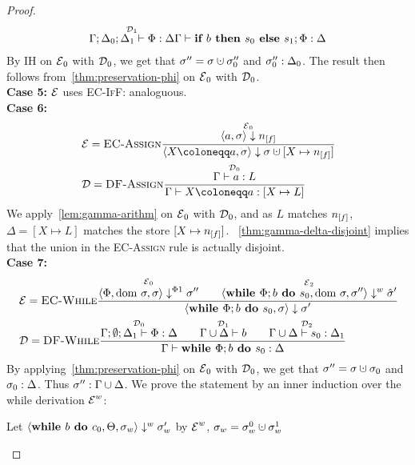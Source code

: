 \begin{proof}
\begin{align*}
{        \overset{\operatorname{\mathcal{D}}_1}{\Gamma;\Delta_0;\Delta_1 \vdash {\Phi}: \Delta}}
        {\Gamma \vdash {\textbf{if }{b} \textbf{ then }{s_0}\textbf{ else }{s_1};{\Phi}}: \Delta}
    \end{align*}
    By IH on $\operatorname{\mathcal{E}}_0$ with $\operatorname{\mathcal{D}}_0$, we get that $\store'' = \store \dunion \store''_0$ and 
    ${\sigma''_0}:{\Delta_0}$.
    The result then follows from~\autoref{thm:preservation-phi} on $\operatorname{\mathcal{E}}_0$ with $\operatorname{\mathcal{D}}_0$.\\
    \textbf{Case 5:}
    $\operatorname{\mathcal{E}}$ uses \textsc{EC-IfF}: analoguous.\\
    \textbf{Case 6:}
    \begin{align*}
        &\E = \bsrule{EC-Assign}{\overset{\E_0}{\bigstep{a}{\store}{\flagged{}}}}
        {\bigstep{\defaultstore}{\store}{\storeassign{\store}{X \mapsto \flagged{}}}}\\
        &\D = \trule{DF-Assign}{\overset{\D_0}{\typestep{\Gamma}{a}{L}}}
        {\typestep{\Gamma}{\defaultstore}{[X \mapsto L]}}
    \end{align*}
    We apply~\autoref{lem:gamma-arithm} on $\operatorname{\mathcal{E}}_0$ with $\operatorname{\mathcal{D}}_0$,
    and as $L$ matches $\flagged{}$, $\Delta = [X \mapsto L]$ matches the store
    $[X \mapsto \flagged{}]$.
    ~\autoref{thm:gamma-delta-disjoint} implies that the union in the \textsc{EC-Assign}
    rule is actually disjoint.
    \\
    \textbf{Case 7:}\\
    \begin{align*}
        &\operatorname{\mathcal{E}} = \textsc{EC-While}\frac{\displaystyle \overset{\operatorname{\mathcal{E}}_0}{\langle \Phi, \text{dom }{\sigma}, \sigma \rangle \downarrow^{\Phi1} \sigma''}\qquad
        \overset{\operatorname{\mathcal{E}}_2}{\langle \textbf{while }\Phi;{b} \textbf{ do } {s_0}, \text{dom }{\sigma}, \sigma'' \rangle \downarrow^w \hat{\sigma}'}}{\displaystyle \langle \textbf{while }\Phi;{b} \textbf{ do } {s_0}, \sigma \rangle \downarrow \sigma'}\\
        &\operatorname{\mathcal{D}} = \textsc{DF-While}\frac{\displaystyle \overset{\operatorname{\mathcal{D}}_0}{\Gamma;\emptyset;\Delta_1 \vdash {\Phi}: \Delta}\qquad
        \overset{\operatorname{\mathcal{D}}_1}{\Gamma \cup \Delta \vdash {b}}\qquad
        \overset{\operatorname{\mathcal{D}}_2}{\Gamma \cup \Delta \vdash {s_0}: \Delta_1}}{\displaystyle \Gamma \vdash {\textbf{while }\Phi;{b} \textbf{ do } {s_0}}: \Delta}
    \end{align*}
    By applying~\autoref{thm:preservation-phi} on $\operatorname{\mathcal{E}}_0$ with $\operatorname{\mathcal{D}}_0$, we get that
    $\store'' = \store \dunion \store_0$ and ${\sigma_0}:{\Delta}$.
    Thus ${\sigma''}:{\Gamma \cup \Delta}$.
    We prove the statement by an inner induction over the while derivation $\operatorname{\mathcal{E}}^w$:
    \begin{claim}
        Let $\langle \textbf{while }{b} \textbf{ do } {c_0}, \Theta, \sigma_w \rangle \downarrow^w \sigma_w'$ by $\operatorname{\mathcal{E}}^w$,
         $\store_w = \store_w^0 \dunion \store_w^1$

\end{claim}
\end{proof}
